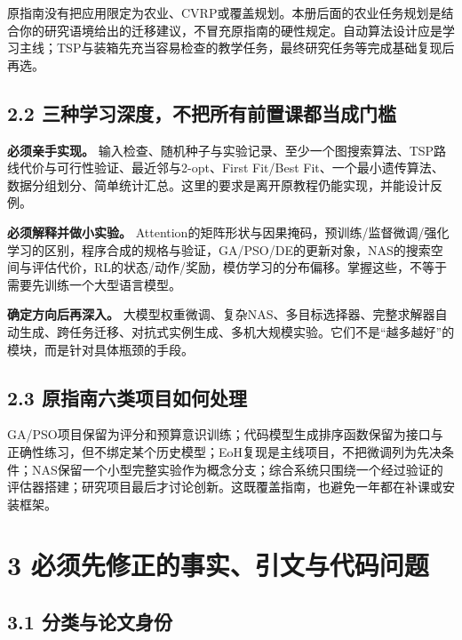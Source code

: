 原指南没有把应用限定为农业、CVRP或覆盖规划。本册后面的农业任务规划是结合你的研究语境给出的迁移建议，不冒充原指南的硬性规定。自动算法设计应是学习主线；TSP与装箱先充当容易检查的教学任务，最终研究任务等完成基础复现后再选。

\subsection{2.2
三种学习深度，不把所有前置课都当成门槛}\label{ux4e09ux79cdux5b66ux4e60ux6df1ux5ea6ux4e0dux628aux6240ux6709ux524dux7f6eux8bfeux90fdux5f53ux6210ux95e8ux69db}

\textbf{必须亲手实现。}
输入检查、随机种子与实验记录、至少一个图搜索算法、TSP路线代价与可行性验证、最近邻与2-opt、First
Fit/Best
Fit、一个最小遗传算法、数据分组划分、简单统计汇总。这里的要求是离开原教程仍能实现，并能设计反例。

\textbf{必须解释并做小实验。}
Attention的矩阵形状与因果掩码，预训练/监督微调/强化学习的区别，程序合成的规格与验证，GA/PSO/DE的更新对象，NAS的搜索空间与评估代价，RL的状态/动作/奖励，模仿学习的分布偏移。掌握这些，不等于需要先训练一个大型语言模型。

\textbf{确定方向后再深入。}
大模型权重微调、复杂NAS、多目标选择器、完整求解器自动生成、跨任务迁移、对抗式实例生成、多机大规模实验。它们不是``越多越好''的模块，而是针对具体瓶颈的手段。

\subsection{2.3
原指南六类项目如何处理}\label{ux539fux6307ux5357ux516dux7c7bux9879ux76eeux5982ux4f55ux5904ux7406}

GA/PSO项目保留为评分和预算意识训练；代码模型生成排序函数保留为接口与正确性练习，但不绑定某个历史模型；EoH复现是主线项目，不把微调列为先决条件；NAS保留一个小型完整实验作为概念分支；综合系统只围绕一个经过验证的评估器搭建；研究项目最后才讨论创新。这既覆盖指南，也避免一年都在补课或安装框架。

\section{3
必须先修正的事实、引文与代码问题}\label{ux5fc5ux987bux5148ux4feeux6b63ux7684ux4e8bux5b9eux5f15ux6587ux4e0eux4ee3ux7801ux95eeux9898}

\subsection{3.1
分类与论文身份}\label{ux5206ux7c7bux4e0eux8bbaux6587ux8eabux4efd}

